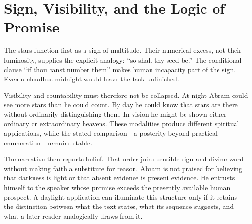 \section{Sign, Visibility, and the Logic of Promise}

The stars function first as a sign of multitude. Their numerical excess, not
their luminosity, supplies the explicit analogy: ``so shall thy seed be.''
The conditional clause ``if thou canst number them'' makes human incapacity
part of the sign. Even a cloudless midnight would leave the task unfinished.

Visibility and countability must therefore not be collapsed. At night Abram
could see more stars than he could count. By day he could know that stars are
there without ordinarily distinguishing them. In vision he might be shown
either ordinary or extraordinary heavens. These modalities produce different
spiritual applications, while the stated comparison---a posterity beyond
practical enumeration---remains stable.

The narrative then reports belief. That order joins sensible sign and divine
word without making faith a substitute for reason. Abram is not praised for
believing that darkness is light or that absent evidence is present evidence.
He entrusts himself to the speaker whose promise exceeds the presently
available human prospect. A daylight application can illuminate this structure
only if it retains the distinction between what the text states, what its
sequence suggests, and what a later reader analogically draws from it.

